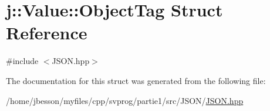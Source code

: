 \hypertarget{structj_1_1_value_1_1_object_tag}{\section{j\-:\-:Value\-:\-:Object\-Tag Struct Reference}
\label{structj_1_1_value_1_1_object_tag}
}


{\ttfamily \#include $<$J\-S\-O\-N.\-hpp$>$}



The documentation for this struct was generated from the following file\-:\begin{DoxyCompactItemize}
\item 
/home/jbesson/myfiles/cpp/svprog/partie1/src/\-J\-S\-O\-N/\hyperlink{_j_s_o_n_8hpp}{J\-S\-O\-N.\-hpp}\end{DoxyCompactItemize}
